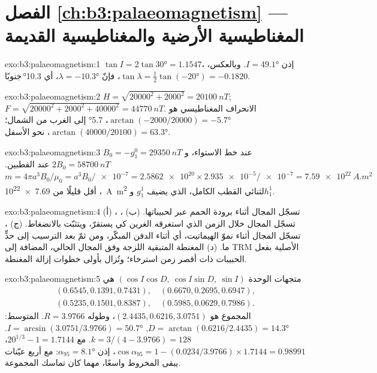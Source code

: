 \section*{الفصل \ref{ch:b3:palaeomagnetism} --- المغناطيسية الأرضية والمغناطيسية القديمة}

\begin{solution}{exo:b3:palaeomagnetism:1}
$\tan I = 2\tan\ang{30} = 1.1547$، إذن $I = \ang{49.1}$. وبالعكس، $\tan\lambda
= \tfrac12\tan(\ang{-20}) = -0.1820$، فإنّ $\lambda = \ang{-10.3}$، أي
\ang{10.3}\,جنوبًا.
\end{solution}

\begin{solution}{exo:b3:palaeomagnetism:2}
$H = \sqrt{20000^2 + 2000^2} = \qty{20100}{nT}$;
$F = \sqrt{20000^2 + 2000^2 + 40000^2} = \qty{44770}{nT}$. الانحراف
المغناطيسي هو $\arctan(-2000/20000) = \ang{-5.7}$، \ang{5.7} إلى الغرب من الشمال؛
 $\arctan(40000/20100) = \ang{63.3}$، نحو الأسفل.
\end{solution}

\begin{solution}{exo:b3:palaeomagnetism:3}
$B_0 = -g_1^0 = \qty{29350}{nT}$ عند خط الاستواء، و$2B_0 = \qty{58700}{nT}$ عند
القطبين. $m = 4\pi a^3B_0/\mu_0 = a^3B_0/\num{e-7} = \num{2.5862e20}\times
\num{2.935e-5}/\num{e-7} = \qty{7.59e22}{A.m^2}$، أقل قليلًا من
\qty{7.69e22}{A.m^2} لثنائي القطب الكامل، الذي يضيف $g_1^1$ و$h_1^1$.
\end{solution}

\begin{solution}{exo:b3:palaeomagnetism:4}
(أ) ، تسجّل المجال أثناء برودة الحمم
عبر  لحبيباتها. (ب) ، تسجّل المجال خلال الزمن الذي استغرقه الغرين كي يستقرّ،
ويتثبّت بالانضغاط. (ج) ، تسجّل المجال
أثناء نموّ الهيماتيت، أي أثناء الدفن المبكّر، ومن ثمّ بعد الترسيب إلى حدٍّ ما.
(د) المغنطة المتبقية اللزجة وفق المجال الحالي، المضافة إلى
TRM الأصلية بفعل الحبيبات ذات أقصر زمن استرخاء؛
وتُزال بأولى خطوات إزالة المغنطة.
\end{solution}

\begin{solution}{exo:b3:palaeomagnetism:5}
متجهات الوحدة $(\cos I\cos D,\ \cos I\sin D,\ \sin I)$ هي
\begin{gather*}
  (0.6545, 0.1391, 0.7431),\quad (0.6670, 0.2695, 0.6947),\\
  (0.5235, 0.1501, 0.8387),\quad (0.5985, 0.0629, 0.7986).
\end{gather*}
المجموع هو $(2.4435, 0.6216, 3.0751)$، وطوله $R = 3.9766$. المتوسط:
$D = \arctan(0.6216/2.4435) = \ang{14.3}$, $I = \arcsin(3.0751/3.9766) =
\ang{50.7}$. $k = 3/(4 - 3.9766) = 128$. مع $20^{1/3} - 1 = 1.7144$،
$\cos\alpha_{95} = 1 - (0.0234/3.9766)\times1.7144 = 0.98991$، إذن
$\alpha_{95} = \ang{8.1}$: مع أربع عيّنات يبقى المخروط واسعًا، مهما
كان تماسك المجموعة.
\end{solution}

